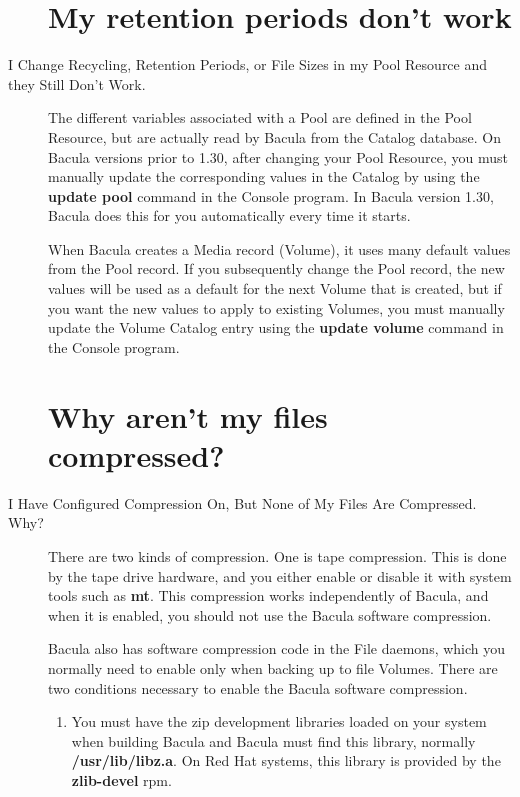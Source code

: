 \begin{description}
\label{periods}
\section{My retention periods don't work}
\item [I Change Recycling, Retention Periods, or File Sizes in my Pool
   Resource  and they Still Don't Work.]
  The different variables associated with a Pool are defined in the  Pool
  Resource, but are actually read by Bacula from the Catalog database.  On
  Bacula versions prior to 1.30, after changing your Pool Resource,  you must
  manually update the corresponding values in the Catalog by  using the {\bf
  update pool} command in the Console program. In Bacula  version 1.30, Bacula
  does this for you automatically every time it  starts.  
  
  When Bacula creates a Media record (Volume), it uses many default  values from
  the Pool record. If you subsequently change the Pool  record, the new values
  will be used as a default for the next Volume  that is created, but if you
  want the new values to apply to existing  Volumes, you must manually update
  the Volume Catalog entry using  the {\bf update volume} command in the Console
  program. 

\label{CompressionNotWorking}
\section{Why aren't my files compressed?}
\item [I Have Configured Compression On, But None of My Files Are
   Compressed.  Why?]
   There are two kinds of compression. One is tape compression. This  is done by
   the tape drive hardware, and you either enable or disable  it with system
   tools such as {\bf mt}. This compression works  independently of Bacula,  
   and when it is enabled, you should not use the Bacula software 
   compression.
   
   Bacula also has software compression code in the File daemons, which you
   normally need to enable only when backing up to file Volumes.  There are
   two conditions necessary to enable the Bacula software compression.

\begin{enumerate}
\item You must have the zip development libraries loaded on your system
   when building Bacula and Bacula must find this library, normally {\bf
   /usr/lib/libz.a}.  On Red Hat systems, this library is provided by the
   {\bf zlib-devel} rpm.


\end{enumerate}
\end{description}
